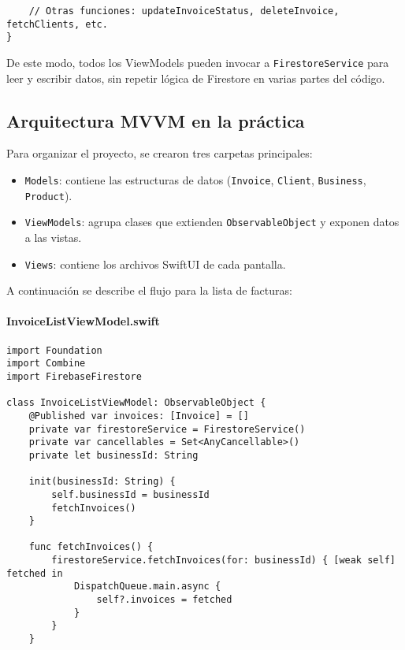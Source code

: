 \begin{large}
\begin{verbatim}
    // Otras funciones: updateInvoiceStatus, deleteInvoice, fetchClients, etc.
}
\end{verbatim}

De este modo, todos los ViewModels pueden invocar a \texttt{FirestoreService} para leer y escribir datos, sin repetir lógica de Firestore en varias partes del código.

\end{large}

\subsection{Arquitectura MVVM en la práctica}

\begin{large}

Para organizar el proyecto, se crearon tres carpetas principales:

\begin{itemize}
  \item \texttt{Models}: contiene las estructuras de datos (\texttt{Invoice}, \texttt{Client}, \texttt{Business}, \texttt{Product}).
  \item \texttt{ViewModels}: agrupa clases que extienden \texttt{ObservableObject} y exponen datos a las vistas.
  \item \texttt{Views}: contiene los archivos SwiftUI de cada pantalla.
\end{itemize}

A continuación se describe el flujo para la lista de facturas:

\paragraph{InvoiceListViewModel.swift}
\begin{verbatim}
import Foundation
import Combine
import FirebaseFirestore

class InvoiceListViewModel: ObservableObject {
    @Published var invoices: [Invoice] = []
    private var firestoreService = FirestoreService()
    private var cancellables = Set<AnyCancellable>()
    private let businessId: String

    init(businessId: String) {
        self.businessId = businessId
        fetchInvoices()
    }

    func fetchInvoices() {
        firestoreService.fetchInvoices(for: businessId) { [weak self] fetched in
            DispatchQueue.main.async {
                self?.invoices = fetched
            }
        }
    }


\end{verbatim}
\end{large}
